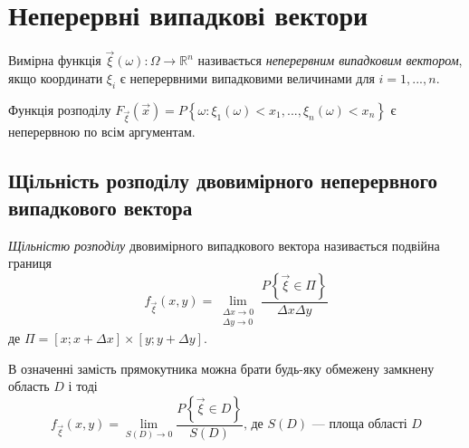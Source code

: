 \section{Неперервні випадкові вектори}

\begin{definition}
    Вимірна функція $\vec{\xi}(\omega): \Omega \rightarrow \mathbb{R}^n$ називається 
    \emph{неперервним випадковим вектором}, якщо координати $\xi_i$ є 
    неперервними випадковими величинами для $i = 1,...,n$.
\end{definition}
Функція розподілу $F_{\vec{\xi}}\left(\vec{x}\right) = 
P\left\{\omega:\xi_1(\omega)<x_1,...,\xi_n(\omega)<x_n\right\}$ є неперервною по всім аргументам.

\subsection{Щільність розподілу двовимірного неперервного випадкового вектора}
\begin{definition}
    \emph{Щільністю розподілу} двовимірного випадкового вектора називається 
    подвійна границя
    \begin{equation}
        f_{\vec{\xi}}(x, y) = \lim_{\substack{\Delta x \to 0 \\ 
        \Delta y \to 0}} \frac{P\left\{\vec{\xi} \in \Pi\right\}}
        {\Delta x \Delta y}
    \end{equation}
    де $\Pi = \left[x; x+\Delta x\right] \times \left[y; y+\Delta y\right]$.
\end{definition}
\begin{remark}
    В означенні замість прямокутника можна брати будь-яку обмежену замкнену область  
    $D$ і тоді
    \begin{equation*}
        f_{\vec{\xi}}(x, y) = \lim_{S(D) \to 0} 
        \frac{P\left\{\vec{\xi} \in D\right\}}
        {S(D)}\text{, де } S(D) \text{ --- площа області } D
    \end{equation*}
\end{remark}

